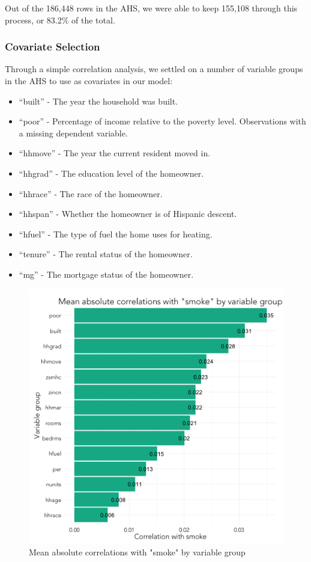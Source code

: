 \documentclass{sig-alternate}
\begin{document}
Out of the 186,448 rows in the AHS, we were able to keep 155,108 through this process, or 83.2\% of the total. 

\subsubsection{Covariate Selection}

Through a simple correlation analysis, we settled on a number of variable groups in the AHS to use as covariates in our model:

\begin{itemize} 
\item ``built'' - The year the household was built. 
\item ``poor'' - Percentage of income relative to the poverty level. Observations with a missing dependent variable.
\item ``hhmove'' - The year the current resident moved in.
\item ``hhgrad'' - The education level of the homeowner.
\item ``hhrace'' - The race of the homeowner.
\item ``hhspan'' - Whether the homeowner is of Hispanic descent.
\item ``hfuel'' - The type of fuel the home uses for heating. 
\item ``tenure'' - The rental status of the homeowner.
\item ``mg'' - The mortgage status of the homeowner.
\end{itemize}

\begin{figure}
\centering 
\includegraphics[scale=0.42]{explore-correlations-1-2.png}
\caption{Mean absolute correlations with "smoke" by variable group}
\end{figure}
\end{document}
